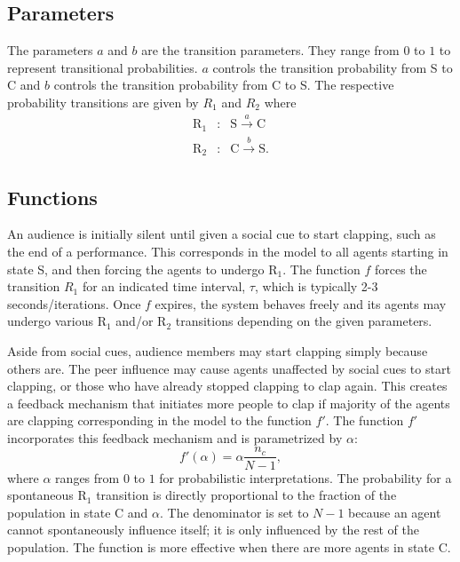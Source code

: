 \subsection{Parameters}
\hspace{\parindent}The parameters $a$ and $b$ are the transition parameters.
They range from $0$ to $1$ to represent transitional probabilities.
$a$ controls the transition probability from S to C and $b$ controls the transition probability from C to S.
The respective probability transitions are given by ${R}_{1}$ and ${R}_{2}$ where
\begin{eqnarray}
\mathrm{R}_{1} &:& \mathrm{S} \overset{a}{\longrightarrow} \mathrm{C} \label{eq:r1} \\
\mathrm{R}_{2} &:& \mathrm{C} \overset{b}{\longrightarrow} \mathrm{S}.\label{eq:r2}
\end{eqnarray}


\subsection{Functions}
\hspace{\parindent}An audience is initially silent until given a social cue to start clapping, such as the end of a performance. 
This corresponds in the model to all agents starting in state S, and then forcing the agents to undergo $\mathrm{R}_{1}$.
The function $f$ forces the transition ${R}_{1}$ for an indicated time interval, $\tau$, which is typically 2-3 seconds/iterations.
Once $f$ expires, the system behaves freely and its agents may undergo various $\mathrm{R}_{1}$ and/or $\mathrm{R}_{2}$ transitions depending on the given parameters.


Aside from social cues, audience members may start clapping simply because others are.
The peer influence may cause agents unaffected by social cues to start clapping, or those who have already stopped clapping to clap again.
This creates a feedback mechanism that initiates more people to clap if majority of the agents are clapping corresponding in the model to the function $f'$.
The function $f'$ incorporates this feedback mechanism and is parametrized by $\alpha$:
\begin{equation}\label{eq:f'}
  f'(\alpha) = \alpha \frac{n_c}{N-1},
\end{equation}
where $\alpha$ ranges from $0$ to $1$ for probabilistic interpretations.
The probability for a spontaneous $\mathrm{R}_{1}$ transition is directly proportional to the fraction of the population in state C and $\alpha$. The denominator is set to $N-1$ because an agent cannot spontaneously influence itself; it is only influenced by the rest of the population.
The function is more effective when there are more agents in state C.


